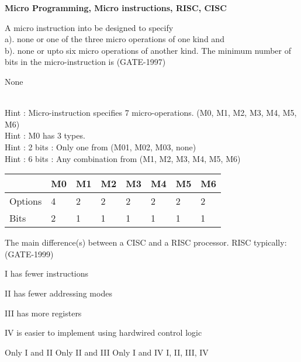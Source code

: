 
\centerline{\textbf{ \LARGE Micro Programming, Micro instructions, RISC, CISC}}


\begin{questyle}
  \question  A micro instruction into be designed to specify \\ a). none or one of the three micro
             operations of one kind and \\b). none or upto six micro operations of another kind.
             The minimum number of bits in the micro-instruction is  (GATE-1997)

  \begin{oneparchoices}
    \choice         None
  \end{oneparchoices}
  \\ Hint : Micro-instruction specifies 7 micro-operations. (M0, M1, M2, M3, M4, M5, M6)
  \\ Hint : M0 has 3 types.
  \\ Hint : 2 bits : Only one from (M01, M02, M03, none)
  \\ Hint : 6 bits : Any combination from (M1, M2, M3, M4, M5, M6)

    \begin{myTableStyle} \begin{tabular}{ |m{1cm}|m{0.2cm}|m{0.2cm}|m{0.2cm}|m{0.2cm}|m{0.2cm}|m{0.2cm}|m{0.2cm}| } \hline
                & M0 & M1 & M2 & M3 & M4 & M5 & M6 \\ \hline
        Options & 4  & 2  & 2  & 2  & 2  & 2  & 2 \\ \hline
        Bits    & 2  & 1  & 1  & 1  & 1  & 1  & 1 \\ \hline
    \end{tabular} \end{myTableStyle} \vspace{0.08in}
\end{questyle}

\begin{questyle}
  \question  The main difference(s) between a CISC and a RISC processor. RISC typically:  (GATE-1999)

    \begin{multicols}{2}
        \item[I] has fewer instructions
        \item[II] has fewer addressing modes
        \item[III] has more registers
        \item[IV] is easier to implement using hardwired control logic
    \end{multicols}

  \begin{oneparchoices}
    \choice         Only I and II
    \choice         Only II and III
    \choice         Only I and IV
    \CorrectChoice  I, II, III, IV
  \end{oneparchoices}
\end{questyle}


